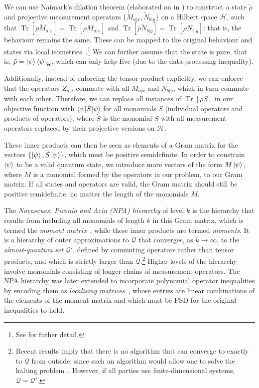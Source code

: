 \documentclass[10pt, a4paper]{article}
\numberwithin{equation}{section} %
\theoremstyle{definition}
\theoremstyle{plain}
\newcommand{\?}{\mathrel{?}} %
\newcommand{\Tr}[2][]{\mathop{\mathrm{Tr}#1}\left[ #2 \right]} %
\newcommand{\Hs}{\mathcal{H}} %
\newcommand{\Qs}{\mathcal{Q}}
\begin{document}
        We can use Naimark's dilation theorem (elaborated on in ) to construct a state \(\tilde{\rho}\) and projective measurement operators \(\{\tilde{M}_{a|x}, \tilde{N}_{b|y}\}\) on a Hilbert space \(\Hs\), such that \(\Tr{\tilde{\rho}\tilde{M}_{a|x}} = \Tr{\rho M_{a|x}}\) and  \(\Tr{\tilde{\rho}\tilde{N}_{b|y}} = \Tr{\rho N_{b|y}}\): that is, the behaviour remains the same. These can be mapped to the original behaviour and states via local isometries~\cite{BFF_QRE}.\footnote{See  for futher detail.} We can further assume that the state is pure, that is, \(\tilde{\rho} = {\ket{\psi}\bra{\psi}}_{\Hs}\), which can only help Eve (due to the data-processing inequality).

        Additionally, instead of enforcing the tensor product explicitly, we can enforce that the operators \(Z_{a,i}\) commute with all \(\tilde{M}_{a|x}\) and \(\tilde{N}_{b|y}\), which in turn commute with each other. Therefore, we can replace all instances of \(\Tr{\rho S}\) in our objective function with \(\braket{\psi|\tilde{S}|\psi}\) for all monomials \(S\) (individual operators and products of operators), where \(\tilde{S}\) is the monomial \(S\) with all measurement operators replaced by their projective versions on \(\Hs\).

        These inner products can then be seen as elements of a Gram matrix for the vectors \(\{\ket{\psi}, \tilde{S}\ket{\psi}\}\), which must be positive semidefinite. In order to constrain \(\ket{\psi}\) to be a valid quantum state, we introduce more vectors of the form \(M\ket{\psi}\), where \(M\) is a monomial formed by the operators in our problem, to our Gram matrix. If all states and operators are valid, the Gram matrix should still be positive semidefinite, no matter the length of the monomials \(M\).

        The \emph{Navascues, Pironio and Acin (NPA) hierarchy} of level \(k\) is the hierarchy that results from including all monomials of length \(k\) in this Gram matrix, which is termed the \emph{moment matrix}~\cite{BoundingQ, ConvHierQ}, while these inner products are termed \emph{moments}. It is a hierarchy of outer approximations to \(\Qs\) that converges, as \(k\to\infty\), to the \emph{almost-quantum set} \(\Qs'\), defined by commuting operators rather than tensor products, and which is strictly larger than \(\Qs\).\footnote{Recent results imply that there is no algorithm that can converge to exactly to \(\Qs\) from outside, since such an algorithm would allow one to solve the halting problem~\cite{MIPRE}. However, if all parties use finite-dimensional systems, \(\Qs = \Qs'\).} Higher levels of the hierarchy involve monomials consisting of longer chains of measurement operators. The NPA hierarchy was later extended to incorporate polynomial operator inequalities by encoding them as \emph{localising matrices}~\cite{NPAHierarchy}, whose entries are linear combinations of the elements of the moment matrix and which must be PSD for the original inequalities to hold.
\end{document}

